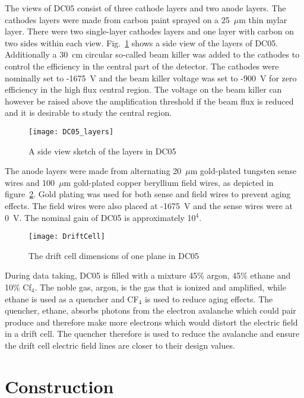 The views of DC05 consist of three cathode layers and two anode layers.  The
cathodes layers were made from carbon paint sprayed on a 25~$\mu$m thin mylar
layer.  There were two single-layer cathodes layers and one layer with carbon on
two sides within each view.  Fig.~\ref{fig::DC05_layers} shows a side view of
the layers of DC05.  Additionally a 30~cm circular so-called beam killer was
added to the cathodes to control the efficiency in the central part of the
detector.  The cathodes were nominally set to -1675~V and the beam killer
voltage was set to -900~V for zero efficiency in the high flux central region.
The voltage on the beam killer can however be raised above the amplification
threshold if the beam flux is reduced and it is desirable to study the central
region.

\begin{figure}[h!t]
  \centering \texttt{[image: DC05\_layers]}
  \caption{A side view sketch of the layers in DC05}
  \label{fig::DC05_layers}
\end{figure}

The anode layers were made from alternating 20~$\mu$m gold-plated tungsten sense
wires and 100~$\mu$m gold-plated copper beryllium field wires, as depicted in
figure~\ref{fig:driftcell}.  Gold plating was used for both sense and field
wires to prevent aging effects.  The field wires were also placed at -1675~V and
the sense wires were at 0~V.  The nominal gain of DC05 is approximately 10$^4$.

\begin{figure}
  \centering \texttt{[image: DriftCell]}
  \caption{}{The drift cell dimensions of one plane in DC05}
  \label{fig:driftcell}%
\end{figure}

During data taking, DC05 is filled with a mixture 45\% argon, 45\% ethane and
10\% Cf$_4$.  The noble gas, argon, is the gas that is ionized and amplified,
while ethane is used as a quencher and CF$_4$ is used to reduce aging effects.
The quencher, ethane, absorbs photons from the electron avalanche which could
pair produce and therefore make more electrons which would distort the electric
field in a drift cell.  The quencher therefore is used to reduce the avalanche
and ensure the drift cell electric field lines are closer to their design values.  


\section{Construction}

